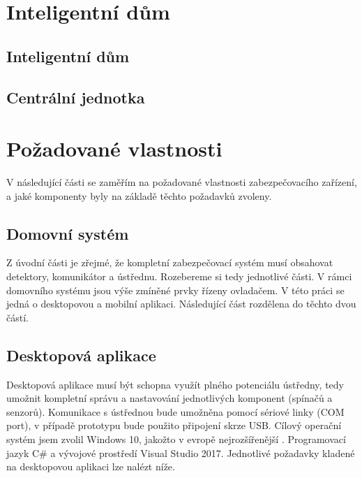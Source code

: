 \documentclass[FM,DP]{tulthesis}  %
\begin{document}

\section{Inteligentní dům}

\subsection{Inteligentní dům}

\subsection{Centrální jednotka}


\section{Požadované vlastnosti}
V následující části se zaměřím na požadované vlastnosti zabezpečovacího zařízení, a jaké komponenty byly na základě těchto požadavků zvoleny.

\subsection{Domovní systém}
Z úvodní části je zřejmé, že kompletní zabezpečovací systém musí obsahovat detektory, komunikátor a ústřednu. Rozebereme si tedy jednotlivé části.
V rámci domovního systému jsou výše zmíněné prvky řízeny ovladačem. V této práci se jedná o desktopovou a mobilní aplikaci. Následující část rozdělena do těchto dvou částí.

\subsection{Desktopová aplikace}
Desktopová aplikace musí být schopna využít plného potenciálu ústředny, tedy umožnit kompletní správu a nastavování jednotlivých komponent (spínačů a senzorů). Komunikace s ústřednou bude umožněna pomocí sériové linky (COM port), v případě prototypu bude použito připojení skrze USB. Cílový operační systém jsem zvolil Windows 10, jakožto v evropě nejrozšířenější \cite{DesktopMarketShare}. Programovací jazyk C\# a vývojové prostředí Visual Studio 2017. Jednotlivé požadavky kladené na desktopovou aplikaci lze nalézt níže.
\end{document}
